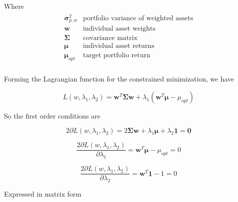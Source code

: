 \documentclass{article}[11pt]
\begin{document}
Where
\begin{subequations}
\begin{align}
\begin{array}{cl}
\mathbf{\sigma}_{p,w}^2      & \mbox{portfolio variance of weighted assets} \\
\mathbf{w}         & \mbox{individual asset weights}  \\
\mathbf{\Sigma}    & \mbox{covariance matrix} \\
\mathbf{\mu}       & \mbox{individual asset returns} \\
\mathbf{\mu}_{opt} & \mbox{target portfolio return} \\
\end{array}
\end{align}
\label{eq:notation}
\end{subequations}

Forming the Lagrangian function for the constrained minimization, we have

\begin{equation}
L(w,\lambda_1,\lambda_2) = \mathbf{w}^T \mathbf{\Sigma} \mathbf{w} + \lambda_1 (\mathbf{w}^T \mathbf{\mu} - \mu_{opt})
\label{eq:lagrangian}
\end{equation}

So the first order conditions are

\begin{equation}
2 \partial L(w,\lambda_1,\lambda_2) = 2 \mathbf{\Sigma} \mathbf{w} + \lambda_1 \mathbf{\mu} + \lambda_2 \mathbf{\underline{1}} = \mathbf{\underline{0}}
\label{eq:foc1}
\end{equation}

\begin{equation}
\frac{2 \partial L(w,\lambda_1,\lambda_2)}{\partial \lambda_1} = \mathbf{w}^T \mathbf{\mu} - \mu_{opt} = 0
\label{eq:foc2}
\end{equation}

\begin{equation}
\frac{2 \partial L(w,\lambda_1,\lambda_2)}{\partial \lambda_2} = \mathbf{w}^T \mathbf{\underline{1}} - 1 = 0
\label{eq:foc3}
\end{equation}

Expressed in matrix form
\end{document}
